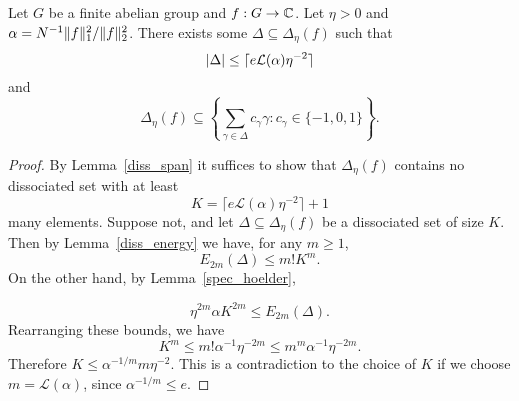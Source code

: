 \begin{theorem}
\label{chang}
\leanok
Let $G$ be a finite abelian group and $f:G\to \mathbb{C}$. Let $\eta >0$ and $\alpha=N^{-1}\lVert f\rVert_1^2/\lVert f\rVert_2^2$. There exists some $\Delta\subseteq \Delta_\eta(f)$ such that
\[\left\lvert \Delta\right\rvert\leq \lceil e\mathcal{L}(\alpha)\eta^{-2}\rceil \]
and
\[\Delta_\eta(f)\subseteq \left\{ \sum_{\gamma\in\Delta}c_\gamma \gamma : c_\gamma\in \{-1,0,1\} \right\}.\]
\end{theorem}

\begin{proof}
\leanok
By Lemma~\ref{diss_span} it suffices to show that $\Delta_\eta(f)$ contains no dissociated set with at least
\[K= \lceil e\mathcal{L}(\alpha)\eta^{-2}\rceil+1\]
many elements. Suppose not, and let $\Delta\subseteq \Delta_\eta(f)$ be a dissociated set of size $K$. Then by Lemma~\ref{diss_energy} we have, for any $m\geq 1$,
\[E_{2m}(\Delta)\leq m!K^m.\]
On the other hand, by Lemma~\ref{spec_hoelder},

\[\eta^{2m}\alpha K^{2m}\leq E_{2m}(\Delta).\]
Rearranging these bounds, we have
\[K^m \leq m! \alpha^{-1}\eta^{-2m}\leq m^m\alpha^{-1}\eta^{-2m}.\]
Therefore $K\leq \alpha^{-1/m}m\eta^{-2}$. This is a contradiction to the choice of $K$ if we choose $m=\mathcal{L}(\alpha)$, since $\alpha^{-1/m}\leq e$.
\end{proof}
